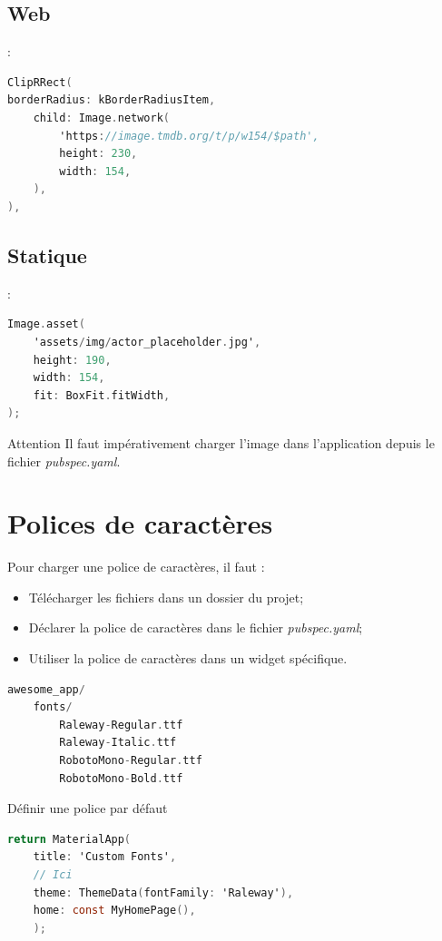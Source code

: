 \documentclass[10pt]{beamer}
\begin{document}
\subsection{Web}
\begin{frame}[fragile]{\secname : \subsecname}
    \begin{lstlisting}[language=C]
ClipRRect(
borderRadius: kBorderRadiusItem,
    child: Image.network(
        'https://image.tmdb.org/t/p/w154/$path',
        height: 230,
        width: 154,
    ),
),
\end{lstlisting}
\end{frame}
\subsection{Statique}
\begin{frame}[fragile]{\secname : \subsecname}
    \begin{lstlisting}[language=C]
Image.asset(
    'assets/img/actor_placeholder.jpg',
    height: 190,
    width: 154,
    fit: BoxFit.fitWidth,
);
\end{lstlisting}
    \begin{alertblock}{Attention}
        Il faut impérativement charger l'image dans l'application depuis le fichier \emph{pubspec.yaml}.
    \end{alertblock}
\end{frame}

\section{Polices de caractères}
\begin{frame}[fragile]{\secname}
    Pour charger une police de caractères, il faut :
    \begin{itemize}
        \item Télécharger les fichiers dans un dossier du projet;
        \item Déclarer la police de caractères dans le fichier \emph{pubspec.yaml};
        \item Utiliser la police de caractères dans un widget spécifique.
    \end{itemize}
    \begin{lstlisting}[language=C]
awesome_app/
    fonts/
        Raleway-Regular.ttf
        Raleway-Italic.ttf
        RobotoMono-Regular.ttf
        RobotoMono-Bold.ttf
\end{lstlisting}
\end{frame}

\begin{frame}[fragile]{\secname}
    Définir une police par défaut
    \begin{lstlisting}[language=C]
return MaterialApp(
    title: 'Custom Fonts',
    // Ici
    theme: ThemeData(fontFamily: 'Raleway'),
    home: const MyHomePage(),
    );
\end{lstlisting}
\end{frame}
\end{document}
